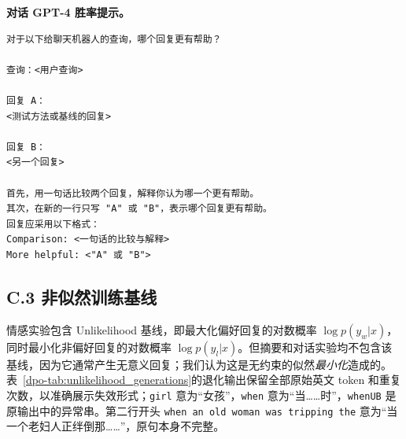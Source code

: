 \textbf{对话 GPT-4 胜率提示。}
\begin{verbatim}
对于以下给聊天机器人的查询，哪个回复更有帮助？

查询：<用户查询>

回复 A：
<测试方法或基线的回复>

回复 B：
<另一个回复>

首先，用一句话比较两个回复，解释你认为哪一个更有帮助。
其次，在新的一行只写 "A" 或 "B"，表示哪个回复更有帮助。
回复应采用以下格式：
Comparison: <一句话的比较与解释>
More helpful: <"A" 或 "B">
\end{verbatim}

\subsection*{C.3 非似然训练基线}
情感实验包含 Unlikelihood 基线\cite{dpo-welleck2019neural}，即最大化偏好回复的对数概率 $\log p(y_w|x)$，同时最小化非偏好回复的对数概率 $\log p(y_l|x)$。但摘要和对话实验均不包含该基线，因为它通常产生无意义回复；我们认为这是无约束的似然\emph{最小化}造成的。表~\ref{dpo-tab:unlikelihood_generations}的退化输出保留全部原始英文 token 和重复次数，以准确展示失效形式；\texttt{girl} 意为“女孩”，\texttt{when} 意为“当……时”，\texttt{whenUB} 是原输出中的异常串。第二行开头 \texttt{when an old woman was tripping the} 意为“当一个老妇人正绊倒那……”，原句本身不完整。

